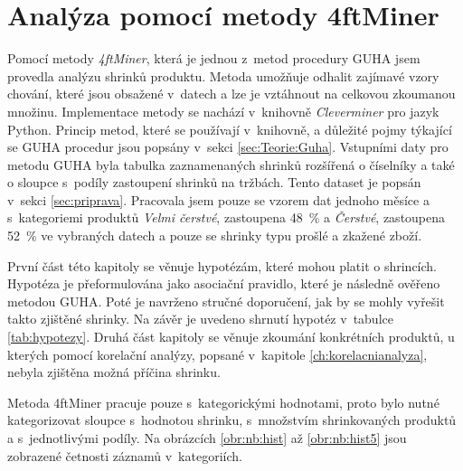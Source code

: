 \chapter{Analýza pomocí metody 4ftMiner}
\label{ch:cleverminer}

Pomocí metody \emph{4ftMiner}, která je jednou z~metod procedury GUHA jsem provedla analýzu shrinků produktu. Metoda umožňuje odhalit zajímavé vzory chování, které jsou obsažené v~datech a lze je vztáhnout na celkovou zkoumanou množinu. Implementace metody se nachází v~knihovně \emph{Cleverminer} pro jazyk Python. Princip metod, které se používají v~knihovně, a důležité pojmy týkající se GUHA procedur jsou popsány v~sekci \ref*{sec:Teorie:Guha}. Vstupními daty pro metodu GUHA byla tabulka zaznamenaných shrinků rozšířená o číselníky a také o sloupce s~podíly zastoupení shrinků na tržbách. Tento dataset je popsán v~sekci \ref{sec:priprava}.
Pracovala jsem pouze se vzorem dat jednoho měsíce a s~kategoriemi produktů \emph{Velmi čerstvé}, zastoupena 48~\% a \emph{Čerstvé}, zastoupena 52~\% ve vybraných datech a pouze se shrinky typu prošlé a zkažené zboží. 

První část této kapitoly se věnuje hypotézám, které mohou platit o shrincích. Hypotéza je přeformulována jako asociační pravidlo, které je následně ověřeno metodou GUHA. Poté je navrženo stručné doporučení, jak by se mohly vyřešit takto zjištěné shrinky.  Na závěr je uvedeno shrnutí hypotéz v~tabulce \ref*{tab:hypotezy}. Druhá část kapitoly se věnuje zkoumání konkrétních produktů, u kterých pomocí korelační analýzy, popsané v~kapitole \ref*{ch:korelacnianalyza}, nebyla zjištěna možná příčina shrinku.

Metoda 4ftMiner pracuje pouze s~kategorickými hodnotami, proto bylo nutné kategorizovat sloupce s~hodnotou shrinku, s~množstvím shrinkovaných produktů a s~jednotlivými podíly. Na obrázcích \ref*{obr:nb:hist} až \ref{obr:nb:hist5} jsou zobrazené četnosti záznamů v~kategoriích.

